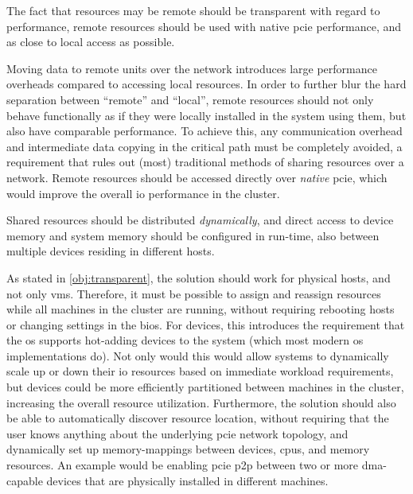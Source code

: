 \begin{objective}\label{obj:performance}
    The fact that resources may be remote should be transparent with regard to performance, remote resources should be used with native \gls{pcie} performance, and as close to local access as possible.
\end{objective}
Moving data to remote units over the network introduces large performance overheads compared to accessing local resources. 
In order to further blur the hard separation between ``remote'' and ``local'', remote resources should not only behave functionally as if they were locally installed in the system using them, but also have comparable performance.
To achieve this, any communication overhead and intermediate data copying in the critical path must be completely avoided, a requirement that rules out (most) traditional methods of sharing resources over a network. 
Remote resources should be accessed directly over \emph{native} \gls{pcie}, which would improve the overall \gls{io} performance in the cluster.



\begin{objective}\label{obj:dynamic}
    Shared resources should be distributed \emph{dynamically}, and direct access to device memory and system memory should be configured in run-time, also between multiple devices residing in different hosts.
\end{objective}
As stated in \cref{obj:transparent}, the solution should work for physical hosts, and not only \glspl{vm}. Therefore, it must be possible to assign and reassign resources while all machines in the cluster are running, without requiring rebooting hosts or changing settings in the \gls{bios}.
For devices, this introduces the requirement that the \gls{os} supports hot-adding devices to the system (which most modern \gls{os} implementations do).
Not only would this would allow systems to dynamically scale up or down their \gls{io} resources based on immediate workload requirements, but devices could be more efficiently partitioned between machines in the cluster, increasing the overall resource utilization. 
Furthermore, the solution should also be able to automatically discover resource location, without requiring that the user knows anything about the underlying \gls{pcie} network topology, and dynamically set up memory-mappings between devices, \glspl{cpu}, and memory resources. An example would be enabling \gls{pcie} \gls{p2p} between two or more \gls{dma}-capable devices that are physically installed in different machines.

